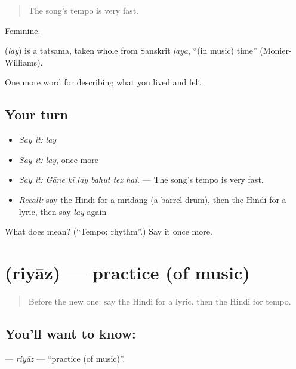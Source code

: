 \begin{quote}
The song's tempo is very fast.
\end{quote}

Feminine.

\begin{cousinweb}
\textbf{} (\emph{lay}) is a tatsama, taken whole from Sanskrit \emph{laya}, \textquotedblleft{}(in music) time\textquotedblright{} (Monier-Williams).
\end{cousinweb}

\begin{grammarlens}[title={What you've built}]
One more word for describing what you lived and felt.
\end{grammarlens}

\subsection*{Your turn}
\begin{itemize}
\raggedright
  \item \emph{Say it:} \emph{lay}
  \item \emph{Say it:} \emph{lay}, once more
  \item \emph{Say it:} \emph{Gāne kī lay bahut tez hai.} — The song's tempo is very fast.
  \item \emph{Recall:} say the Hindi for a mridang (a barrel drum), then the Hindi for a lyric, then say \emph{lay} again
\end{itemize}

\begin{tcolorbox}[breakable,colback=teal!4,colframe=teal!35!black,title={Before you move on}]
What does  mean? (\textquotedblleft{}Tempo; rhythm\textquotedblright{}.) Say it once more.
\end{tcolorbox}
\section[\texorpdfstring{\hi{रियाज़} (riyāz)}{रियाज़ (riyāz)}]{ (riyāz) — practice (of music)}

\label{lesson:HI-C532-riyaz}



\begin{quote}
Before the new one: say the Hindi for a lyric, then the Hindi for tempo.
\end{quote}

\subsection*{You'll want to know: }
\textbf{} — \emph{riyāz} — \textquotedblleft{}practice (of music)\textquotedblright{}.

